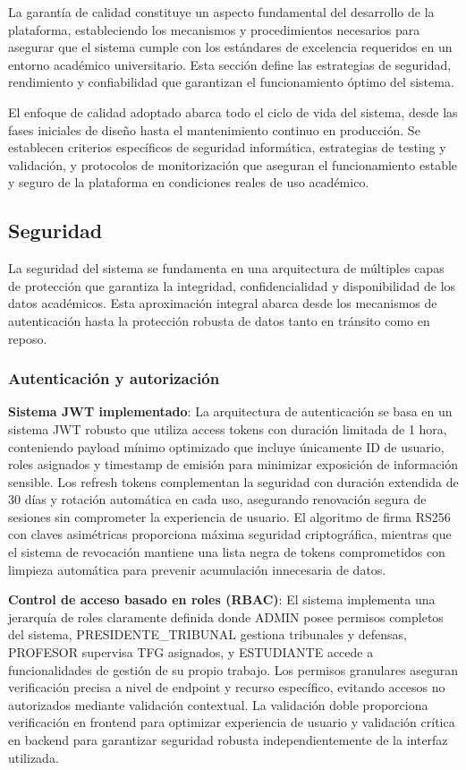 \documentclass[12pt,a4paper,oneside]{report}
\begin{document}
La garantía de calidad constituye un aspecto fundamental del desarrollo de la plataforma, estableciendo los mecanismos y procedimientos necesarios para asegurar que el sistema cumple con los estándares de excelencia requeridos en un entorno académico universitario. Esta sección define las estrategias de seguridad, rendimiento y confiabilidad que garantizan el funcionamiento óptimo del sistema.

El enfoque de calidad adoptado abarca todo el ciclo de vida del sistema, desde las fases iniciales de diseño hasta el mantenimiento continuo en producción. Se establecen criterios específicos de seguridad informática, estrategias de testing y validación, y protocolos de monitorización que aseguran el funcionamiento estable y seguro de la plataforma en condiciones reales de uso académico.

\subsection{Seguridad}\label{seguridad-1}

La seguridad del sistema se fundamenta en una arquitectura de múltiples capas de protección que garantiza la integridad, confidencialidad y disponibilidad de los datos académicos. Esta aproximación integral abarca desde los mecanismos de autenticación hasta la protección robusta de datos tanto en tránsito como en reposo.

\subsubsection{Autenticación y
autorización}\label{autenticaciuxf3n-y-autorizaciuxf3n}

\textbf{Sistema JWT implementado}: La arquitectura de autenticación se basa en un sistema JWT robusto que utiliza access tokens con duración limitada de 1 hora, conteniendo payload mínimo optimizado que incluye únicamente ID de usuario, roles asignados y timestamp de emisión para minimizar exposición de información sensible. Los refresh tokens complementan la seguridad con duración extendida de 30 días y rotación automática en cada uso, asegurando renovación segura de sesiones sin comprometer la experiencia de usuario. El algoritmo de firma RS256 con claves asimétricas proporciona máxima seguridad criptográfica, mientras que el sistema de revocación mantiene una lista negra de tokens comprometidos con limpieza automática para prevenir acumulación innecesaria de datos.

\textbf{Control de acceso basado en roles (RBAC)}: El sistema implementa una jerarquía de roles claramente definida donde ADMIN posee permisos completos del sistema, PRESIDENTE\_TRIBUNAL gestiona tribunales y defensas, PROFESOR supervisa TFG asignados, y ESTUDIANTE accede a funcionalidades de gestión de su propio trabajo. Los permisos granulares aseguran verificación precisa a nivel de endpoint y recurso específico, evitando accesos no autorizados mediante validación contextual. La validación doble proporciona verificación en frontend para optimizar experiencia de usuario y validación crítica en backend para garantizar seguridad robusta independientemente de la interfaz utilizada.
\end{document}
